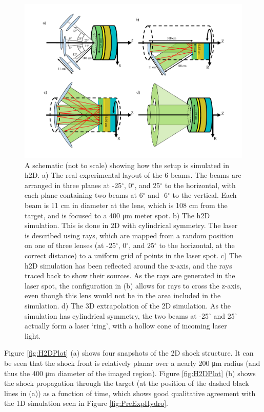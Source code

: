 \begin{figure}[hbt!]
\centering
\includegraphics[width=1\textwidth]{figures/Experiment/H2DSchematic.pdf}%
\caption{\label{fig:H2DSchematic} A schematic (not to scale) showing how the setup is simulated in h2D. a) The real experimental layout of the 6 beams. The beams are arranged in three planes at -25$^{\circ}$, 0$^{\circ}$, and 25$^{\circ}$ to the horizontal, with each plane containing two beams at 6$^{\circ}$ and -6$^{\circ}$ to the vertical. Each beam is 11 \unit{\centi\meter} in diameter at the lens, which is 108 \unit{\centi\meter} from the target, and is focused to a 400 \unit{\micro\meter} meter spot. b) The h2D simulation. This is done in 2D with cylindrical symmetry. The laser is described using rays, which are mapped from a random position on one of three lenses (at -25$^{\circ}$, 0$^{\circ}$, and 25$^{\circ}$ to the horizontal, at the correct distance) to a uniform grid of points in the laser spot. c) The h2D simulation has been reflected around the x-axis, and the rays traced back to show their sources. As the rays are generated in the laser spot, the configuration in (b) allows for rays to cross the z-axis, even though this lens would not be in the area included in the simulation. d) The 3D extrapolation of the 2D simulation. As the simulation has cylindrical symmetry, the two beams at -25$^{\circ}$ and 25$^{\circ}$ actually form a laser `ring', with a hollow cone of incoming laser light.}
\end{figure}

Figure \ref{fig:H2DPlot} (a) shows four snapshots of the 2D shock structure. It can be seen that the shock front is relatively planar over a nearly 200 \unit{\micro\meter} radius (and thus the 400 \unit{\micro\meter} diameter of the imaged region). Figure \ref{fig:H2DPlot} (b) shows the shock propagation through the target (at the position of the dashed black lines in (a)) as a function of time, which shows good qualitative agreement with the 1D simulation seen in Figure \ref{fig:PreExpHydro}.

